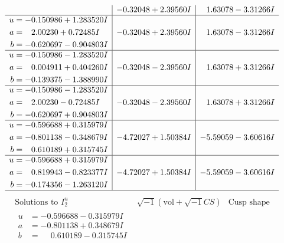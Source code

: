 \documentclass[1p]{elsarticle_modified}
\theoremstyle{definition}
\newcommand{\I}{\sqrt{-1}}
\begin{document}
$$\begin{array}{c|c|c}
 & -0.32048 + 2.39560 I & \phantom{-}1.63078 - 3.31266 I \\ \hline\begin{aligned}
u &= -0.150986 + 1.283520 I \\
a &= \phantom{-}2.00230 + 0.72485 I \\
b &= -0.620697 - 0.904803 I\end{aligned}
 & -0.32048 + 2.39560 I & \phantom{-}1.63078 - 3.31266 I \\ \hline\begin{aligned}
u &= -0.150986 - 1.283520 I \\
a &= \phantom{-}0.004911 + 0.404260 I \\
b &= -0.139375 - 1.388990 I\end{aligned}
 & -0.32048 - 2.39560 I & \phantom{-}1.63078 + 3.31266 I \\ \hline\begin{aligned}
u &= -0.150986 - 1.283520 I \\
a &= \phantom{-}2.00230 - 0.72485 I \\
b &= -0.620697 + 0.904803 I\end{aligned}
 & -0.32048 - 2.39560 I & \phantom{-}1.63078 + 3.31266 I \\ \hline\begin{aligned}
u &= -0.596688 + 0.315979 I \\
a &= -0.801138 - 0.348679 I \\
b &= \phantom{-}0.610189 + 0.315745 I\end{aligned}
 & -4.72027 + 1.50384 I & -5.59059 - 3.60616 I \\ \hline\begin{aligned}
u &= -0.596688 + 0.315979 I \\
a &= \phantom{-}0.819943 - 0.823377 I \\
b &= -0.174356 - 1.263120 I\end{aligned}
 & -4.72027 + 1.50384 I & -5.59059 - 3.60616 I\\
 \hline 
 \end{array}$$\newpage$$\begin{array}{c|c|c}  
\text{Solutions to }I^u_{2}& \I (\text{vol} + \sqrt{-1}CS) & \text{Cusp shape}\\
 \hline 
\begin{aligned}
u &= -0.596688 - 0.315979 I \\
a &= -0.801138 + 0.348679 I \\
b &= \phantom{-}0.610189 - 0.315745 I\end{aligned}

\end{array}$$
\end{document}
